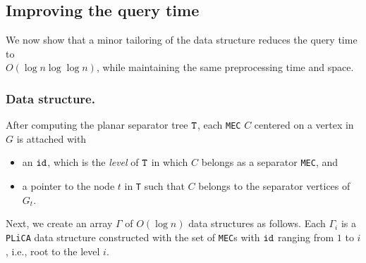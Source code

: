 \documentclass[12pt]{llncs}
\begin{document}
\subsection{Improving the query time}
We now show that a minor tailoring of the data structure reduces 
the query time to\\
 $O(\log n \log\log n)$, while maintaining the same preprocessing 
time and space.

\subsubsection{Data structure.}
After computing the planar separator tree $\tt T$, each {\tt MEC} $C$ centered on a vertex in $G$ is 
attached with 
\begin{itemize}
\item an $\tt id$, which is the {\it level} of $\tt T$ in which $C$ 
belongs as a separator {\tt MEC}, and
\item a pointer to the node $t$ in {\tt T} such that $C$ belongs to the separator 
vertices of 
$G_t$.
\end{itemize}
 Next, we create an array $\Gamma$ of $O(\log n)$ data structures as follows. Each 
$
\Gamma_i$  is a {\tt PLiCA} data structure constructed 
with the set of {\tt MEC}s with $\tt id$ ranging from 
$1$ to $i$, i.e., root to the level $i$.   
\end{document}
